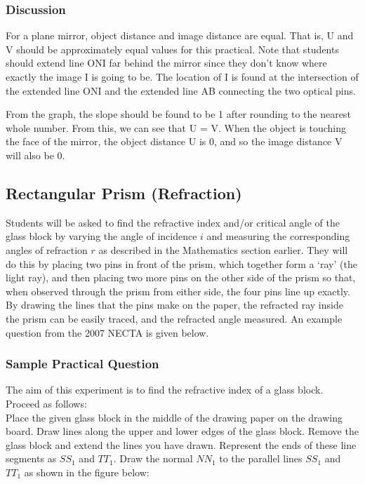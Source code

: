 \subsubsection{Discussion}
For a plane mirror, object distance and image distance are equal. That is, U and V should be approximately equal values for this practical. Note that students should extend line ONI far behind the mirror since they don't know where exactly the image I is going to be. The location of I is found at the intersection of the extended line ONI and the extended line AB connecting the two optical pins.

From the graph, the slope should be found to be 1 after rounding to the nearest whole number. From this, we can see that U = V. When the object is touching the face of the mirror, the object distance U is 0, and so the image distance V will also be 0.

\subsection{Rectangular Prism (Refraction)}  

Students will be asked to find the refractive index and/or critical angle of the glass block by varying
the angle of incidence $i$ and measuring the corresponding angles of refraction $r$ as
described in the Mathematics section earlier. They will do this by placing two pins in
front of the prism, which together form a `ray' (the light ray), and then placing two more
pins on the other side of the prism so that, when observed through the prism from either
side, the four pins line up exactly. By drawing the lines that the pins make on the paper,
the refracted ray inside the prism can be easily traced, and the refracted angle measured.
An example question from the 2007 NECTA is given below.

\subsubsection{Sample Practical Question}

The aim of this experiment is to find the refractive index of a glass block. Proceed
as follows:\\

Place the given glass block in the middle of the drawing paper on the drawing
board. Draw lines along the upper and lower edges of the glass block. Remove the
glass block and extend the lines you have drawn. Represent the ends of these line
segments as $SS_1$ and $TT_1$. Draw the normal $NN_1$ to the parallel lines $SS_1$ and
$TT_1$ as shown in the figure below:


